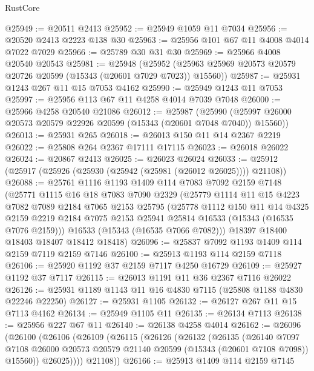 \begin{lexlean}{RustCore}
\begin{coremodule}
@25949 := @20511 @2413
@25952 := @25949 @1059 @11 @7034
@25956 := @20520 @2413 @2223 @138 @30
@25963 := @25956 @101 @67 @11 @4008 @4014 @7022 @7029
@25966 := @25789 @30 @31 @30
@25969 := @25966 @4008 @20540 @20543
@25981 := @25948
    (@25952 (@25963 @25969 @20573 @20579 @20726 @20599 (@15343 (@20601 @7029 @7023)) @15560))
@25987 := @25931 @1243 @267 @11 @15 @7053 @4162
@25990 := @25949 @1243 @11 @7053
@25997 := @25956 @113 @67 @11 @4258 @4014 @7039 @7048
@26000 := @25966 @4258 @20540 @21086
@26012 := @25987
    (@25990 (@25997 @26000 @20573 @20579 @22926 @20599 (@15343 (@20601 @7048 @7040)) @15560))
@26013 := @25931 @265
@26018 := @26013 @150 @11 @14 @2367 @2219
@26022 := @25808 @264 @2367 @17111 @17115
@26023 := @26018 @26022
@26024 := @20867 @2413
@26025 := @26023 @26024
@26033 := @25912 (@25917 (@25926 (@25930 (@25942 (@25981 (@26012 @26025)))) @21108))
@26088 := @25761
    @1116
    @1193
    @1409
    @114
    @7083
    @7092
    @2159
    @7148
    (@25771
      @1115
      @16
      @18
      @7083
      @7090
      @2329
      (@25779
        @1114
        @11
        @15
        @4223
        @7082
        @7089
        @2184
        @7065
        @2153
        @25795
        (@25778
          @1112
          @150
          @11
          @14
          @4325
          @2159
          @2219
          @2184
          @7075
          @2153
          @25941
          @25814
          @16533
          (@15343 (@16535 @7076 @2159)))
        @16533
        (@15343 (@16535 @7066 @7082)))
      @18397
      @18400
      @18403
      @18407
      @18412
      @18418)
@26096 := @25837 @7092 @1193 @1409 @114 @2159 @7119 @2159 @7146
@26100 := @25913 @1193 @114 @2159 @7118
@26106 := @25920 @1192 @37 @2159 @7117 @4250 @16729
@26109 := @25927 @1192 @37 @7117
@26115 := @26013 @1191 @11 @36 @2367 @7116 @26022
@26126 := @25931 @1189 @1143 @11 @16 @4830 @7115 (@25808 @1188 @4830 @22246 @22250)
@26127 := @25931 @1105
@26132 := @26127 @267 @11 @15 @7113 @4162
@26134 := @25949 @1105 @11
@26135 := @26134 @7113
@26138 := @25956 @227 @67 @11
@26140 := @26138 @4258 @4014
@26162 := @26096
    (@26100
      (@26106
        (@26109
          (@26115
            (@26126
              (@26132
                (@26135
                  (@26140
                    @7097
                    @7108
                    @26000
                    @20573
                    @20579
                    @21140
                    @20599
                    (@15343 (@20601 @7108 @7098))
                    @15560))
                @26025))))
        @21108))
@26166 := @25913 @1409 @114 @2159 @7145

\end{coremodule}
\end{lexlean}
